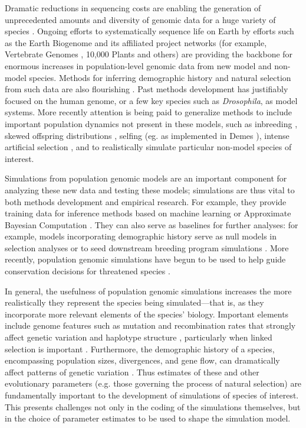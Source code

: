 \documentclass{article}
\begin{document}
Dramatic reductions in sequencing costs are enabling the generation of
unprecedented amounts and diversity of genomic data for a huge variety of species
\citep{Ellegren2014}. Ongoing efforts to systematically sequence life on
Earth by efforts such as the Earth Biogenome \citep{Lewin2022} and its
affiliated project networks (for example, Vertebrate Genomes
\citep{Rhie2021}, 10,000 Plants \citep{Cheng2018} and others) are
providing the backbone for enormous increases in population-level genomic data from
new model and non-model species. Methods for inferring
demographic history and natural selection from such data are also flourishing
\citep{Beichman2018}. Past methods development has justifiably focused on the
human genome, or a few key species such as \emph{Drosophila}, 
as model systems. More recently attention is being paid to
generalize methods to include important population dynamics not present
in these models, such as inbreeding \citep{Blischak2020}, skewed offspring
distributions \citep{Montano2016}, selfing (eg. as implemented in Demes
\citep{Gower2022}), intense artificial selection \citep{MacLeod2013,
MacLeod2014}, and to realistically simulate particular non-model species of interest.

Simulations from population genomic models are an important component
for analyzing these new data and testing these models; 
simulations are thus vital to both methods
development and empirical research. For example, they provide training
data for inference methods based on machine learning \citep{Schrider2018} or
Approximate Bayesian Computation \citep{Csillery2010}. They can also serve as
baselines for further analyses: for example, models incorporating
demographic history serve as null models in selection analyses
\citep{Hsieh2016a} or to seed downstream breeding program simulations
\citep{Gaynor2020}. More recently, population genomic simulations have begun
to be used to help guide conservation decisions for threatened species
\citep{Teixeira2021}.

In general, the usefulness of population genomic simulations increases
the more realistically they represent the species being simulated---that
is, as they incorporate more relevant elements of the species' biology. Important
elements include genome features such as mutation and recombination
rates that strongly affect genetic variation and haplotype structure
\citep{Nachman2002}, particularly when linked selection is important \citep{Cutter2013}. 
Furthermore, the demographic history of a
species, encompassing population sizes, divergences, and gene flow, can
dramatically affect patterns of genetic variation \citep{Teshima2006}. Thus
estimates of these and other evolutionary parameters (e.g. those governing
the process of natural selection) are fundamentally important to the
development of simulations of species of interest. This presents
challenges not only in the coding of the simulations themselves, but in
the choice of parameter estimates to be used to shape the simulation
model.
\end{document}
